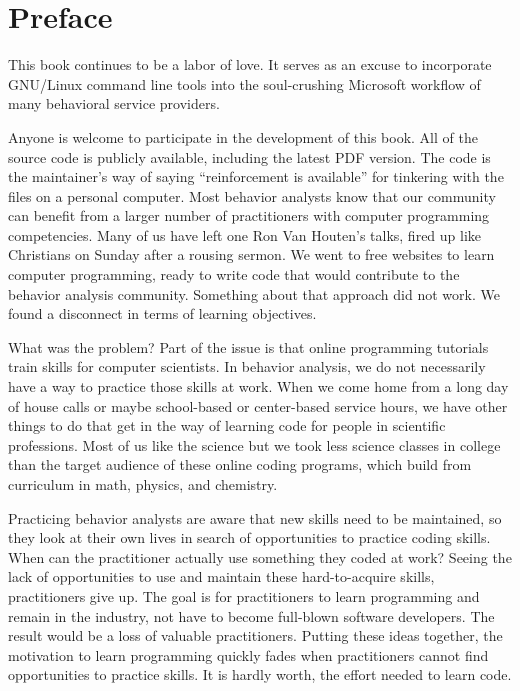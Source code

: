 \chapter{Preface}
This book continues to be a labor of love. It serves as an excuse to incorporate GNU/Linux command line tools into the soul-crushing Microsoft\textregistered{} workflow of many behavioral service providers. 

Anyone is welcome to participate in the development of this book. All of the source code is publicly available, including the latest PDF version. The code is the maintainer's way of saying ``reinforcement is available'' for tinkering with the files on a personal computer. Most behavior analysts know that our community can benefit from a larger number of practitioners with computer programming competencies. Many of us have left one Ron Van Houten's talks, fired up like Christians on Sunday after a rousing sermon. We went to free websites to learn computer programming, ready to write code that would contribute to the behavior analysis community. Something about that approach did not work. We found a disconnect in terms of learning objectives. 

What was the problem? Part of the issue is that online programming tutorials train skills for computer scientists. In behavior analysis, we do not necessarily have a way to practice those skills at work. When we come home from a long day of house calls  or maybe school-based or center-based service hours, we have other things to do that get in the way of learning code for people in scientific professions. Most of us like the science but we took less science classes in college than the target audience of these online coding programs, which build from curriculum in math, physics, and chemistry. 

Practicing behavior analysts are aware that new skills need to be maintained, so they look at their own lives in search of opportunities to practice coding skills. When can the practitioner actually use something they coded at work? Seeing the lack of opportunities to use and maintain these hard-to-acquire skills, practitioners give up. The goal is for practitioners to learn programming and remain in the industry, not have to become full-blown software developers. The result would be a loss of valuable practitioners. Putting these ideas together, the motivation to learn programming quickly fades when practitioners cannot find opportunities to practice skills. It is hardly worth, the effort needed to learn code.

